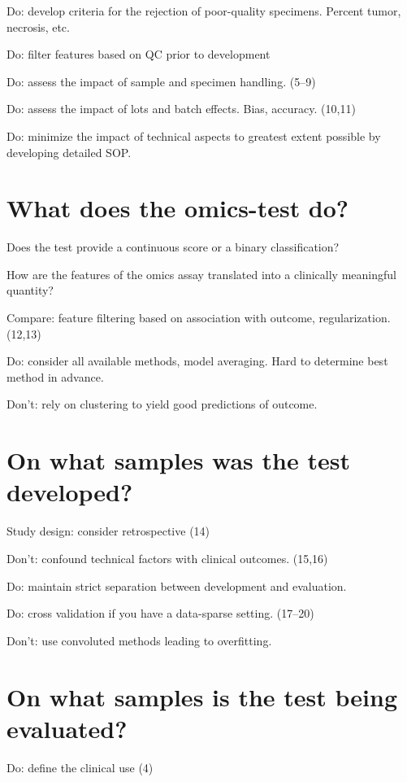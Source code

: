 \documentclass[11pt]{article}
\begin{document}
Do: develop criteria for the rejection of poor-quality specimens.
Percent tumor, necrosis, etc.

Do: filter features based on QC prior to development

Do: assess the impact of sample and specimen handling. (5--9)

Do: assess the impact of lots and batch effects. Bias, accuracy. (10,11)

Do: minimize the impact of technical aspects to greatest extent possible
by developing detailed SOP.

\section{What does the omics-test
do?}\label{what-does-the-omics-test-do}

Does the test provide a continuous score or a binary classification?

How are the features of the omics assay translated into a clinically
meaningful quantity?

Compare: feature filtering based on association with outcome,
regularization. (12,13)

Do: consider all available methods, model averaging. Hard to determine
best method in advance.

Don't: rely on clustering to yield good predictions of outcome.

\section{On what samples was the test
developed?}\label{on-what-samples-was-the-test-developed}

Study design: consider retrospective (14)

Don't: confound technical factors with clinical outcomes. (15,16)

Do: maintain strict separation between development and evaluation.

Do: cross validation if you have a data-sparse setting. (17--20)

Don't: use convoluted methods leading to overfitting.

\section{On what samples is the test being
evaluated?}\label{on-what-samples-is-the-test-being-evaluated}

Do: define the clinical use (4)
\end{document}
